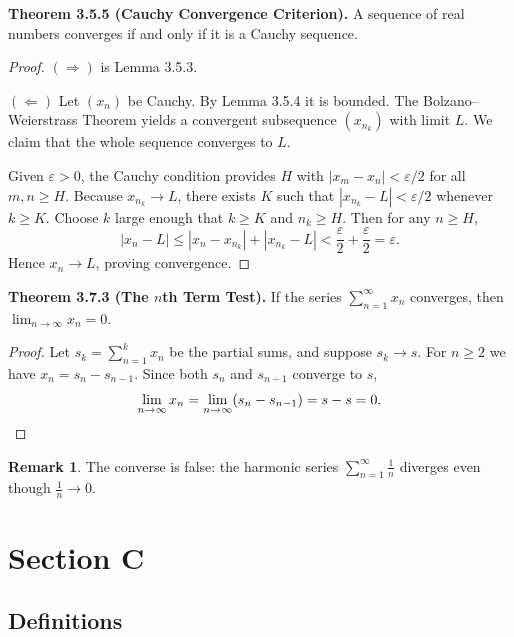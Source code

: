 \documentclass[12pt,a4paper]{article}
\theoremstyle{definition}
\newtheorem*{remark}{Remark}
\newcommand{\eps}{\varepsilon}
\newcommand{\abs}[1]{\left\lvert#1\right\rvert}
\begin{document}
\textbf{Theorem 3.5.5 (Cauchy Convergence Criterion).} A sequence of real numbers converges if and only if it is a Cauchy sequence.

\begin{proof}
\((\Rightarrow)\) is Lemma 3.5.3.

\((\Leftarrow)\) Let \((x_n)\) be Cauchy. By Lemma 3.5.4 it is bounded. The Bolzano–Weierstrass Theorem yields a convergent subsequence \((x_{n_k})\) with limit \(L\). We claim that the whole sequence converges to \(L\).

Given \(\eps>0\), the Cauchy condition provides \(H\) with \(\abs{x_m-x_n}<\eps/2\) for all \(m,n\ge H\). Because \(x_{n_k}\to L\), there exists \(K\) such that \(\abs{x_{n_k}-L}<\eps/2\) whenever \(k\ge K\). Choose \(k\) large enough that \(k\ge K\) and \(n_k\ge H\). Then for any \(n\ge H\),
\[
\abs{x_n-L} \le \abs{x_n-x_{n_k}} + \abs{x_{n_k}-L} < \frac{\eps}{2}+\frac{\eps}{2} = \eps.
\]
Hence \(x_n\to L\), proving convergence.
\end{proof}

\textbf{Theorem 3.7.3 (The \(n\)th Term Test).} If the series \(\sum_{n=1}^{\infty} x_n\) converges, then \(\lim_{n\to\infty} x_n = 0\).

\begin{proof}
Let \(s_k = \sum_{n=1}^{k} x_n\) be the partial sums, and suppose \(s_k \to s\). For \(n\ge 2\) we have \(x_n = s_n - s_{n-1}\). Since both \(s_n\) and \(s_{n-1}\) converge to \(s\),
\[
\lim_{n\to\infty} x_n = \lim_{n\to\infty}(s_n - s_{n-1}) = s - s = 0. \qedhere
\]
\end{proof}

\begin{remark}
The converse is false: the harmonic series \(\sum_{n=1}^{\infty} \frac{1}{n}\) diverges even though \(\frac{1}{n}\to 0\).
\end{remark}

\newpage
\section{Section C}

\subsection{Definitions}
\end{document}
